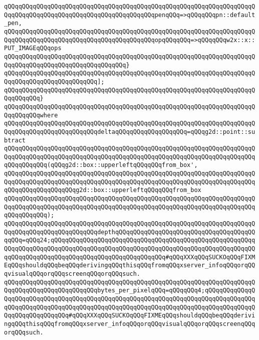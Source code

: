 \verb|qQQqqQQqqQQqqQQqqQQqqQQqqQQqqQQqqQQqqQQqqQQqqQQqqQQqqQQqqQQqqQQqqQQqqQQqqQQqqQQqqQQqqQQqqQQqqQQqqQQqqQQqqQQqqQQqpenqQQq=>qQQqqQQqpn::default_pen,|\newline
\verb|qQQqqQQqqQQqqQQqqQQqqQQqqQQqqQQqqQQqqQQqqQQqqQQqqQQqqQQqqQQqqQQqqQQqqQQqqQQqqQQqqQQqqQQqqQQqqQQqqQQqqQQqqQQqqQQqopqQQqqQQq=>qQQqqQQqw2x::x::PUT_IMAGEqQQqops|\newline
\verb|qQQqqQQqqQQqqQQqqQQqqQQqqQQqqQQqqQQqqQQqqQQqqQQqqQQqqQQqqQQqqQQqqQQqqQQqqQQqqQQqqQQqqQQqqQQqqQQqqQQqqQQq}|\newline
\verb|qQQqqQQqqQQqqQQqqQQqqQQqqQQqqQQqqQQqqQQqqQQqqQQqqQQqqQQqqQQqqQQqqQQqqQQqqQQqqQQqqQQqqQQqqQQqqQQq];|\newline
\verb|qQQqqQQqqQQqqQQqqQQqqQQqqQQqqQQqqQQqqQQqqQQqqQQqqQQqqQQqqQQqqQQqqQQqqQQqqQQqqQQq}|\newline
\verb|qQQqqQQqqQQqqQQqqQQqqQQqqQQqqQQqqQQqqQQqqQQqqQQqqQQqqQQqqQQqqQQqqQQqqQQqqQQqqQQqwhere|\newline
\verb|qQQqqQQqqQQqqQQqqQQqqQQqqQQqqQQqqQQqqQQqqQQqqQQqqQQqqQQqqQQqqQQqqQQqqQQqqQQqqQQqqQQqqQQqqQQqqQQqdeltaqQQqqQQqqQQqqQQqqQQq=qQQqg2d::point::subtract|\newline
\verb|qQQqqQQqqQQqqQQqqQQqqQQqqQQqqQQqqQQqqQQqqQQqqQQqqQQqqQQqqQQqqQQqqQQqqQQqqQQqqQQqqQQqqQQqqQQqqQQqqQQqqQQqqQQqqQQqqQQqqQQqqQQqqQQqqQQqqQQqqQQqqQQqqQQqqQQq(qQQqg2d::box::upperleftqQQqqQQqfrom_box',|\newline
\verb|qQQqqQQqqQQqqQQqqQQqqQQqqQQqqQQqqQQqqQQqqQQqqQQqqQQqqQQqqQQqqQQqqQQqqQQqqQQqqQQqqQQqqQQqqQQqqQQqqQQqqQQqqQQqqQQqqQQqqQQqqQQqqQQqqQQqqQQqqQQqqQQqqQQqqQQqqQQqqQQqg2d::box::upperleftqQQqqQQqfrom_box|\newline
\verb|qQQqqQQqqQQqqQQqqQQqqQQqqQQqqQQqqQQqqQQqqQQqqQQqqQQqqQQqqQQqqQQqqQQqqQQqqQQqqQQqqQQqqQQqqQQqqQQqqQQqqQQqqQQqqQQqqQQqqQQqqQQqqQQqqQQqqQQqqQQqqQQqqQQqqQQq);|\newline
\newline
\verb|qQQqqQQqqQQqqQQqqQQqqQQqqQQqqQQqqQQqqQQqqQQqqQQqqQQqqQQqqQQqqQQqqQQqqQQqqQQqqQQqqQQqqQQqqQQqqQQqdepthqQQqqQQqqQQqqQQqqQQqqQQqqQQqqQQqqQQqqQQqqQQq=qQQq24;qQQqqQQqqQQqqQQqqQQqqQQqqQQqqQQqqQQqqQQqqQQqqQQqqQQqqQQqqQQqqQQqqQQqqQQqqQQqqQQqqQQqqQQqqQQqqQQqqQQqqQQqqQQqqQQqqQQqqQQqqQQqqQQqqQQqqQQqqQQqqQQqqQQqqQQqqQQqqQQqqQQqqQQqqQQq#qQQqXXXqQQqSUCKOqQQqFIXMEqQQqshouldqQQqbeqQQqderivingqQQqthisqQQqfromqQQqxserver_infoqQQqorqQQqvisualqQQqorqQQqscreenqQQqorqQQqsuch.|\newline
\verb|qQQqqQQqqQQqqQQqqQQqqQQqqQQqqQQqqQQqqQQqqQQqqQQqqQQqqQQqqQQqqQQqqQQqqQQqqQQqqQQqqQQqqQQqqQQqqQQqbytes_per_pixelqQQq=qQQqqQQq4;qQQqqQQqqQQqqQQqqQQqqQQqqQQqqQQqqQQqqQQqqQQqqQQqqQQqqQQqqQQqqQQqqQQqqQQqqQQqqQQqqQQqqQQqqQQqqQQqqQQqqQQqqQQqqQQqqQQqqQQqqQQqqQQqqQQqqQQqqQQqqQQqqQQqqQQqqQQqqQQqqQQqqQQqqQQq#qQQqXXXqQQqSUCKOqQQqFIXMEqQQqshouldqQQqbeqQQqderivingqQQqthisqQQqfromqQQqxserver_infoqQQqorqQQqvisualqQQqorqQQqscreenqQQqorqQQqsuch.|\newline
